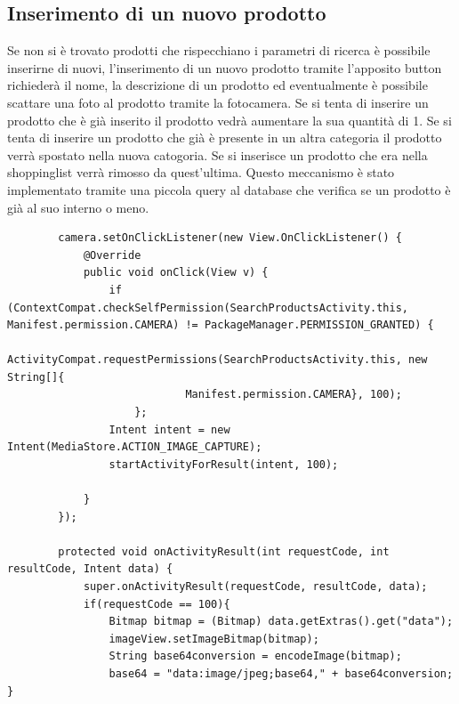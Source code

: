 \documentclass[12pt]{article}
\begin{document}
    \subsection{Inserimento di un nuovo prodotto}
    Se non si è trovato prodotti che rispecchiano i parametri di ricerca è possibile inserirne di nuovi, l'inserimento di un nuovo prodotto
    tramite l'apposito button richiederà il nome, la descrizione di un prodotto ed eventualmente è possibile scattare una foto al prodotto tramite 
    la fotocamera. Se si tenta di inserire un prodotto che è già inserito il prodotto vedrà aumentare la sua quantità di 1. Se si tenta di inserire un
    prodotto che già è presente in un altra categoria il prodotto verrà spostato nella nuova catogoria. Se si inserisce un prodotto che era nella 
    shoppinglist verrà rimosso da quest'ultima. Questo meccanismo è stato implementato tramite una piccola query al database che verifica se un prodotto 
    è già al suo interno o meno.
    \begin{lstlisting}
        camera.setOnClickListener(new View.OnClickListener() {
            @Override
            public void onClick(View v) {
                if (ContextCompat.checkSelfPermission(SearchProductsActivity.this, Manifest.permission.CAMERA) != PackageManager.PERMISSION_GRANTED) {
                    ActivityCompat.requestPermissions(SearchProductsActivity.this, new String[]{
                            Manifest.permission.CAMERA}, 100);
                    };
                Intent intent = new Intent(MediaStore.ACTION_IMAGE_CAPTURE);
                startActivityForResult(intent, 100);

            }
        });

        protected void onActivityResult(int requestCode, int resultCode, Intent data) {
            super.onActivityResult(requestCode, resultCode, data);
            if(requestCode == 100){
                Bitmap bitmap = (Bitmap) data.getExtras().get("data");
                imageView.setImageBitmap(bitmap);
                String base64conversion = encodeImage(bitmap);
                base64 = "data:image/jpeg;base64," + base64conversion; }
    \end{lstlisting}
\end{document}
